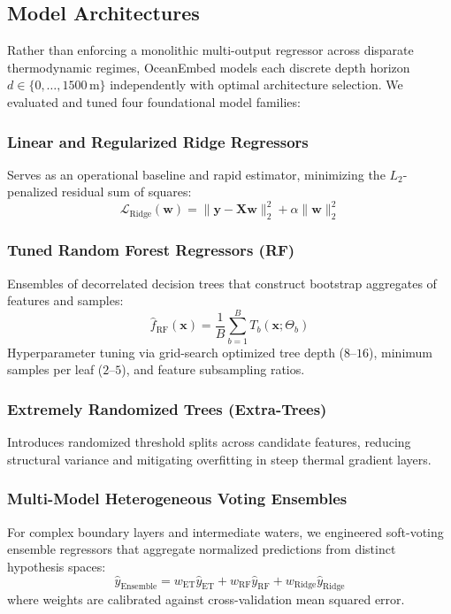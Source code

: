 \documentclass[conference]{IEEEtran}
\begin{document}
\subsection{Model Architectures}
Rather than enforcing a monolithic multi-output regressor across disparate thermodynamic regimes, OceanEmbed models each discrete depth horizon $d \in \{0, \dots, 1500\,\text{m}\}$ independently with optimal architecture selection. We evaluated and tuned four foundational model families:

\subsubsection{Linear and Regularized Ridge Regressors}
Serves as an operational baseline and rapid estimator, minimizing the $L_2$-penalized residual sum of squares:
\begin{equation}
\mathcal{L}_{\text{Ridge}}(\mathbf{w}) = \|\mathbf{y} - \mathbf{X}\mathbf{w}\|_2^2 + \alpha \|\mathbf{w}\|_2^2
\end{equation}

\subsubsection{Tuned Random Forest Regressors (RF)}
Ensembles of decorrelated decision trees that construct bootstrap aggregates of features and samples:
\begin{equation}
\hat{f}_{\text{RF}}(\mathbf{x}) = \frac{1}{B} \sum_{b=1}^B T_b(\mathbf{x}; \Theta_b)
\end{equation}
Hyperparameter tuning via grid-search optimized tree depth ($8\text{--}16$), minimum samples per leaf ($2\text{--}5$), and feature subsampling ratios.

\subsubsection{Extremely Randomized Trees (Extra-Trees)}
Introduces randomized threshold splits across candidate features, reducing structural variance and mitigating overfitting in steep thermal gradient layers.

\subsubsection{Multi-Model Heterogeneous Voting Ensembles}
For complex boundary layers and intermediate waters, we engineered soft-voting ensemble regressors that aggregate normalized predictions from distinct hypothesis spaces:
\begin{equation}
\hat{y}_{\text{Ensemble}} = w_{\text{ET}} \hat{y}_{\text{ET}} + w_{\text{RF}} \hat{y}_{\text{RF}} + w_{\text{Ridge}} \hat{y}_{\text{Ridge}}
\end{equation}
where weights are calibrated against cross-validation mean squared error.
\end{document}
